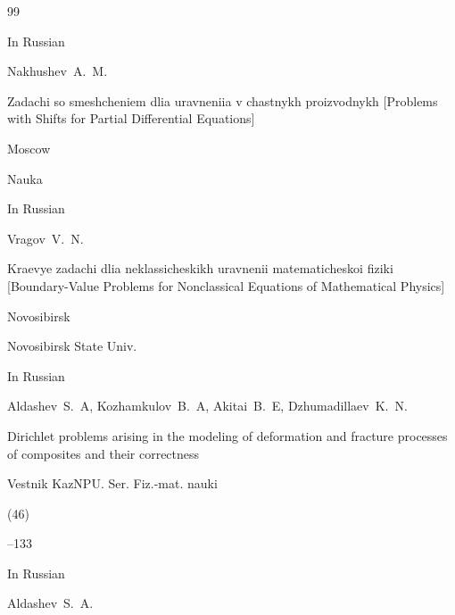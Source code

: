 
%



\pagebreak





\begin{thebibliography}{99}




\lang In Russian

\by  Nakhushev~A.~M.

\book Zadachi so smeshcheniem dlia uravneniia v chastnykh proizvodnykh \rm [Problems with Shifts for Partial Differential Equations]

\publaddr Moscow

\publ Nauka






\lang In Russian

\by  Vragov~V.~N.

\book Kraevye zadachi dlia neklassicheskikh uravnenii matematicheskoi fiziki \rm [Boundary-Value Problems for Nonclassical Equations of Mathematical Physics] 

\publaddr Novosibirsk

\publ  Novosibirsk State Univ.






\lang In Russian

\by Aldashev~S.~A, Kozhamkulov~B.~A, Akitai~B.~E, Dzhumadillaev~K.~N.

\paper  Dirichlet problems arising in the modeling of deformation and fracture processes of composites and their correctness 

\jour Vestnik KazNPU. Ser. Fiz.-mat. nauki


(46)

--133




\lang In Russian

\by Aldashev~S.~A.


\end{thebibliography}
